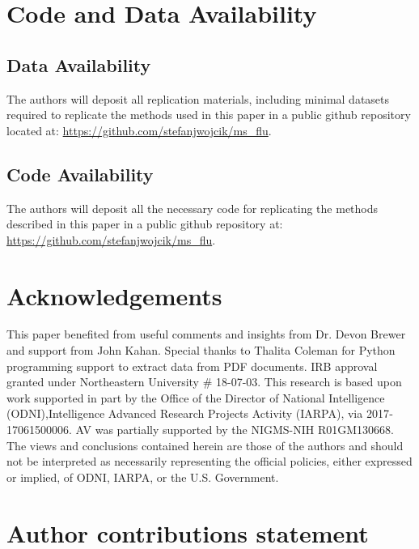 \documentclass[fleqn,10pt]{wlscirep}
\begin{document}
\section*{Code and Data Availability}

\subsection*{Data Availability}

The authors will deposit all replication materials, including minimal datasets required to replicate the methods used in this paper in a public github repository located at: \url{https://github.com/stefanjwojcik/ms_flu}. 

\subsection*{Code Availability}

The authors will deposit all the necessary code for replicating the methods described in this paper in a public github repository at: \url{https://github.com/stefanjwojcik/ms_flu}.






\theendnotes

\section*{Acknowledgements}

This paper benefited from useful comments and insights from Dr. Devon Brewer and support from John Kahan. Special thanks to Thalita Coleman for Python programming support to extract data from PDF documents. IRB approval granted under Northeastern University \# 18-07-03. This research is based upon work supported in part by the Office of the Director of National Intelligence (ODNI),Intelligence Advanced Research Projects Activity (IARPA), via 2017‐17061500006. AV was partially supported by the NIGMS-NIH R01GM130668. The views and conclusions contained herein are those of the authors and should not be interpreted as necessarily representing the official policies, either expressed or implied, of ODNI, IARPA, or the U.S. Government.

\section*{Author contributions statement}
\end{document}
